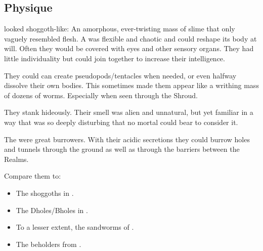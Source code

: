 \subsection{Physique}
\Noggyaleth looked shoggoth-like:
An amorphous, ever-twisting mass of slime that only vaguely resembled flesh.
A \noggyal was flexible and chaotic and could reshape its body at will.
Often they would be covered with eyes and other sensory organs.
They had little individuality but could join together to increase their intelligence.

They could can create pseudopods/tentacles when needed, or even halfway dissolve their own bodies. 
This sometimes made them appear like a writhing mass of dozens of worms. 
Especially when seen through the Shroud. 

They stank hideously.
Their smell was alien and unnatural, but yet familiar in a way that was so deeply disturbing that no mortal could bear to consider it.

The \noggyaleth were great burrowers.
With their acidic secretions they could burrow holes and tunnels through the ground as well as through the barriers between the Realms.


Compare them to:
\begin{itemize}
  \item The shoggoths in \cite{HPLovecraft:AttheMountainsofMadness}.
  \item The Dholes/Bholes in \cite{HPLovecraft:TheDreamQuestofUnknownKadath}. 
  \item To a lesser extent, the sandworms of \cite{FrankHerbert:Dune}.
  \item The beholders from \cite{RPG:DungeonsandDragons}.
\end{itemize}

